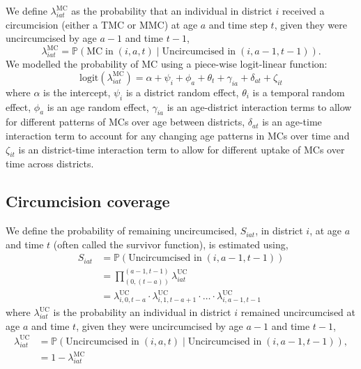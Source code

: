 \documentclass{article}
\begin{document}
\begin{appendix}
\noindent We define $\lambda^{\text{MC}}_{iat}$ as the probability that an individual in district $i$ received a circumcision (either a TMC or MMC) at age $a$ and time step $t$, given they were uncircumcised by age $a-1$ and time $t-1$, 
\begin{equation} 
		\lambda^{\text{MC}}_{iat} = \mathbb{P}(\text{MC} \; \text{in} \; (i,a,t) \; | \; \text{Uncircumcised in} \; (i,a-1, t-1)). 
	\label{eqn::MC}
\end{equation}
We modelled the probability of MC using a piece-wise logit-linear function:
\begin{equation*}
	\text{logit}(\lambda^{\text{MC}}_{iat}) = \alpha + \psi_i + \phi_a + \theta_t + \gamma_{ia} + \delta_{at} + \zeta_{it} 
\end{equation*}
where $\alpha$ is the intercept, $\psi_i$ is a district random effect, $\theta_i$ is a temporal random effect, $\phi_a$ is an age random effect, $\gamma_{ia}$ is an age-district interaction terms to allow for different patterns of MCs over age between districts, $\delta_{at}$ is an age-time interaction term to account for any changing age patterns in MCs over time and $\zeta_{it}$ is an district-time interaction term to allow for different uptake of MCs over time across districts. 


\subsection{Circumcision coverage}
\label{sec::coverage}


We define the probability of remaining uncircumcised, $S_{iat}$, in district $i$, at age $a$ and time $t$ (often called the survivor function), is estimated using, 
\begin{equation*}
	\begin{split}
		S_{iat} &= \mathbb{P}(\text{Uncircumcised in} \; (i,a-1,t-1)) \\
				&= \prod_{(0,(t-a))}^{(a-1,t-1)}\lambda^{\text{UC}}_{iat} \\
				&= \lambda^{\text{UC}}_{i,0,t-a}\cdot \lambda^{\text{UC}}_{i,1,t-a+1}\cdot\ldots \cdot\lambda^{\text{UC}}_{i,a-1,t-1}
	\end{split}
	\label{eqn::survfunc}
\end{equation*}
where $\lambda^{\text{UC}}_{iat}$ is the probability an individual in district $i$ remained uncircumcised at age $a$ and time $t$, given they were uncircumcised by age $a-1$ and time $t-1$,
\begin{equation*}
	\begin{split}
		\lambda^{\text{UC}}_{iat} &= \mathbb{P}(\text{Uncircumcised in}  \; (i,a,t) \; | \; \text{Uncircumcised in} \; (i,a-1, t-1)),\\
		&= 1 - \lambda^{\text{MC}}_{iat} 
	\end{split}
	\label{eqn::uncirc}
\end{equation*}


\end{appendix}
\end{document}
